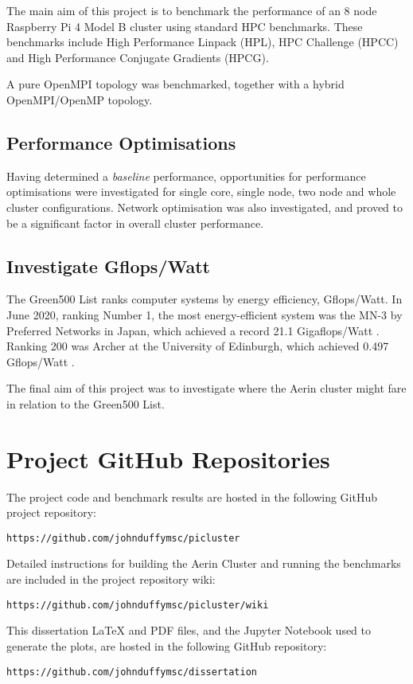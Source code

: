 The main aim of this project is to benchmark the performance of an 8 node Raspberry Pi 4 Model B cluster using standard HPC benchmarks. These benchmarks include High Performance Linpack (HPL), HPC Challenge (HPCC) and High Performance Conjugate Gradients (HPCG).

A pure OpenMPI topology was benchmarked, together with a hybrid OpenMPI/OpenMP topology.


%
%
\subsection{Performance Optimisations}

Having determined a \emph{baseline} performance, opportunities for performance optimisations were investigated for single core, single node, two node and whole cluster configurations. Network optimisation was also investigated, and proved to be a significant factor in overall cluster performance. 


%
%
\subsection{Investigate Gflops/Watt}

The Green500 List ranks computer systems by energy efficiency, Gflops/Watt. In June 2020, ranking Number 1, the most energy-efficient system was the MN-3 by Preferred Networks in Japan, which achieved a record 21.1 Gigaflops/Watt \cite{green500}. Ranking 200 was Archer at the University of Edinburgh, which achieved 0.497 Gflops/Watt \cite{green500}.

The final aim of this project was to investigate where the Aerin cluster might fare in relation to the Green500 List. 


%
%
\section{Project GitHub Repositories}

The project code and benchmark results are hosted in the following GitHub project repository:

\begin{verbatim}
https://github.com/johnduffymsc/picluster
\end{verbatim}

Detailed instructions for building the Aerin Cluster and running the benchmarks are included in the project repository wiki:

\begin{verbatim}
https://github.com/johnduffymsc/picluster/wiki
\end{verbatim}

This dissertation \LaTeX{} and PDF files, and the Jupyter Notebook used to generate the plots, are hosted in the following GitHub repository:

\begin{verbatim}
https://github.com/johnduffymsc/dissertation
\end{verbatim}
 


